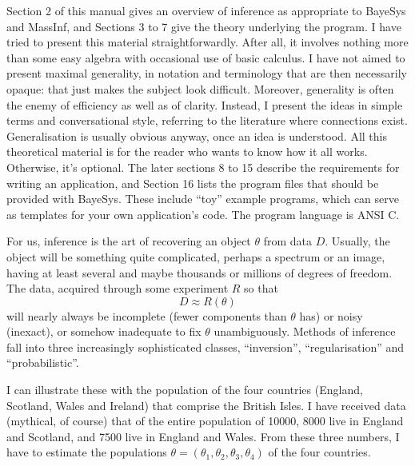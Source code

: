 Section 2 of this manual gives an overview of inference as appropriate to BayeSys and MassInf, and Sections 3 to 7 give the theory underlying the program.
I have tried to present this material straightforwardly.
After all, it involves nothing more than some easy algebra with occasional use of basic calculus.
I have not aimed to present maximal generality, in notation and terminology that are then necessarily opaque: 
that just makes the subject look difficult.
Moreover, generality is often the enemy of efficiency as well as of clarity.
Instead, I present the ideas in simple terms and conversational style, referring to the literature where connections exist.
Generalisation is usually obvious anyway, once an idea is understood.
All this theoretical material is for the reader who wants to know how it all works.  Otherwise, it's optional.
The later sections 8 to 15 describe the requirements for writing an application, and Section 16 lists the program files that should be provided with BayeSys.
These include ``toy'' example programs, which can serve as templates for your own application's code.
The program language is ANSI C.

\vfill\eject
{}
\bigskip

For us, inference is the art of recovering an object $\theta$ from data $D$.
Usually, the object will be something quite complicated, perhaps a spectrum or an image, 
having at least several and maybe thousands or millions of degrees of freedom.  The data, acquired through some experiment $R$ so that
$$
D \approx R(\theta)
$$
will nearly always be incomplete (fewer components than $\theta$ has) or noisy (inexact), or somehow inadequate to fix $\theta$ unambiguously.
Methods of inference fall into three increasingly sophisticated classes, ``inversion'', ``regularisation'' and ``probabilistic''.

I can illustrate these with the population of the four countries (England, Scotland, Wales and Ireland) that comprise the British Isles.
I have received data (mythical, of course) that of the entire population of 10000, 
8000 live in England and Scotland, and 7500 live in England and Wales.  
From these three numbers, I have to estimate the populations $\theta = (\theta_1, \theta_2, \theta_3, \theta_4)$ of the four countries.

